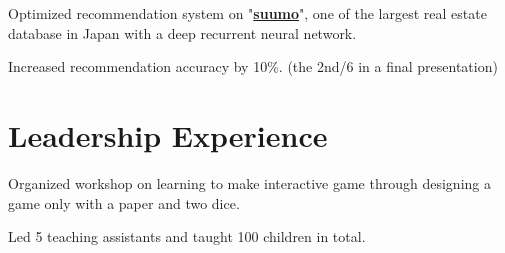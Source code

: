\documentclass[letterpaper]{deedy-resume} %
\begin{document}
\begin{minipage}[t]{0.66\textwidth}
%

\vspace{2mm} %

%
%

\begin{tightitemize}
\item Optimized recommendation system on "\textbf{\href{http://suumo.jp}{suumo}}", one of the largest real estate database in Japan with a deep recurrent neural network.
\item Increased recommendation accuracy by 10\%. (the 2nd/6 in a final presentation)
\end{tightitemize}



\section{Leadership Experience} 

\begin{tightitemize}
\item Organized workshop on learning to make interactive game through designing a game only with a paper and two dice.
\item Led 5 teaching assistants and taught 100 children in total.
\end{tightitemize}



\end{minipage}
\end{document}
